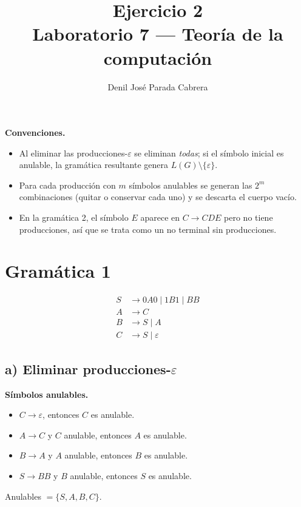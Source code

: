 \documentclass[11pt]{article}
\title{\textbf{Ejercicio 2}\\[2pt]\large Laboratorio 7 --- Teor\'ia de la computaci\'on}
\author{Denil Jos\'e Parada Cabrera}
\date{}
\newcommand{\eps}{\varepsilon}
\begin{document}
\maketitle

\textbf{Convenciones.}
\begin{itemize}[nosep]
  \item Al eliminar las producciones-$\eps$ se eliminan \emph{todas}; si el s\'imbolo inicial es anulable, la gram\'atica resultante genera $L(G)\setminus\{\eps\}$.
  \item Para cada producci\'on con $m$ s\'imbolos anulables se generan las $2^m$ combinaciones (quitar o conservar cada uno) y se descarta el cuerpo vac\'io.
  \item En la gram\'atica 2, el s\'imbolo $E$ aparece en $C \to CDE$ pero no tiene producciones, as\'i que se trata como un no terminal sin producciones.
\end{itemize}

\section*{Gram\'atica 1}
\begin{align*}
S &\to 0A0 \mid 1B1 \mid BB\\
A &\to C\\
B &\to S \mid A\\
C &\to S \mid \eps
\end{align*}

\subsection*{a) Eliminar producciones-$\eps$}

\textbf{S\'imbolos anulables.}
\begin{itemize}[nosep]
  \item $C \to \eps$, entonces $C$ es anulable.
  \item $A \to C$ y $C$ anulable, entonces $A$ es anulable.
  \item $B \to A$ y $A$ anulable, entonces $B$ es anulable.
  \item $S \to BB$ y $B$ anulable, entonces $S$ es anulable.
\end{itemize}
Anulables $=\{S,A,B,C\}$.
\end{document}
